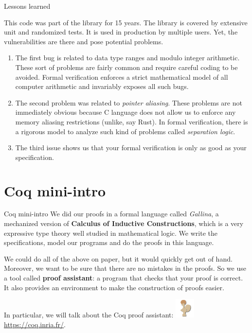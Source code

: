 \documentclass[10pt,usenames,dvipsnames,landscape]{beamer}
\begin{document}
\begin{frame}{Lessons learned}

This code was part of the library for 15 years. The library is covered by extensive unit and randomized tests. It is used in production by multiple users. Yet, the vulnerabilities are there and pose potential problems.

\begin{enumerate}
    \item The first bug is related to data type ranges and modulo integer arithmetic. These sort of problems are fairly common and require careful coding to be avoided. Formal verification enforces a strict mathematical model of all computer arithmetic and invariably exposes all such bugs.
    \item The second problem was related to \textit{pointer aliasing}. These problems are not immediately obvious because C language does not allow us to enforce any memory aliasing restrictions (unlike, say Rust). In formal verification, there is a rigorous model to analyze such kind of problems called \textit{separation logic}.
    \item The third issue shows us that your formal verification is only as good as your specification.
\end{enumerate}

\end{frame}

\section{Coq mini-intro}

\begin{frame}{Coq mini-intro}
  We did our proofs in a formal language called {\it Gallina}, a mechanized version of {\bf Calculus of Inductive Constructions}, which is a very expressive type theory well studied in mathematical logic. We write the specifications, model our programs and do the proofs in this language.

  \smallskip
We could do all of the above on paper, but it would quickly get out of hand. Moreover, we want to be sure that there are no mistakes in the proofs. So we use a tool called {\bf proof assistant}: a program that checks that your proof is correct. It also provides an environment to make the construction of proofs easier. 

In particular, we will talk about the Coq proof assistant: \includegraphics[width=1cm]{coq.png} \url{https://coq.inria.fr/}.

\end{frame}
\end{document}
